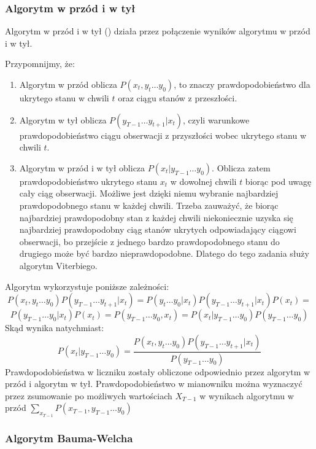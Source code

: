 \subsubsection{Algorytm w przód i w tył}
Algorytm w przód i w tył () działa przez połączenie wyników algorytmu w przód i w tył.

Przypomnijmy, że:

\begin{enumerate}
    \item Algorytm w przód oblicza $P(x_t, y_t \dots y_0)$, to znaczy prawdopodobieństwo dla ukrytego stanu w chwili $t$ oraz ciągu stanów z przeszłości.
    \item Algorytm w tył oblicza $P(y_{T-1} \dots y_{t+1} | x_t)$, czyli warunkowe prawdopodobieństwo ciągu obserwacji z przyszłości wobec ukrytego stanu w chwili $t$.
    \item Algorytm w przód i w tył oblicza $P(x_t | y_{T-1} \dots y_0)$. Oblicza zatem prawdopodobieństwo ukrytego stanu $x_t$ w dowolnej chwili $t$ biorąc pod uwagę cały ciąg obserwacji. Możliwe jest dzięki niemu wybranie najbardziej prawdopodobnego stanu w każdej chwili. Trzeba zauważyć, że biorąc najbardziej prawdopodobny stan z każdej chwili niekoniecznie uzyska się najbardziej prawdopodobny ciąg stanów ukrytych odpowiadający ciągowi obserwacji, bo przejście z jednego bardzo prawdopodobnego stanu do drugiego może być bardzo nieprawdopodobne. Dlatego do tego zadania służy algorytm Viterbiego.
\end{enumerate}

Algorytm  wykorzystuje poniższe zależności:
$$P(x_t, y_t \dots y_0) P(y_{T-1} \dots y_{t+1} | x_t) = P(y_t \dots y_0 | x_t) P(y_{T-1} \dots y_{t+1} | x_t) P(x_t) = $$
$$P(y_{T-1} \dots y_0 | x_t) P(x_t) = P(y_{T-1} \dots y_0, x_t) = P(x_t | y_{T-1} \dots y_0) P(y_{T-1} \dots y_0)$$
Skąd wynika natychmiast:
$$P(x_t | y_{T-1} \dots y_0) = \frac{P(x_t, y_t \dots y_0) P(y_{T-1} \dots y_{t+1} | x_t)}{P(y_{T-1} \dots y_0)}$$
Prawdopodobieństwa w liczniku zostały obliczone odpowiednio przez algorytm w przód i algorytm w tył.
Prawdopodobieństwo w mianowniku można wyznaczyć przez zsumowanie po możliwych wartościach $X_{T-1}$ w wynikach algorytmu
w przód $\sum_{x_{T-1}} P(x_{T-1}, y_{T-1} \dots y_0)$

\subsubsection{Algorytm Bauma-Welcha}

